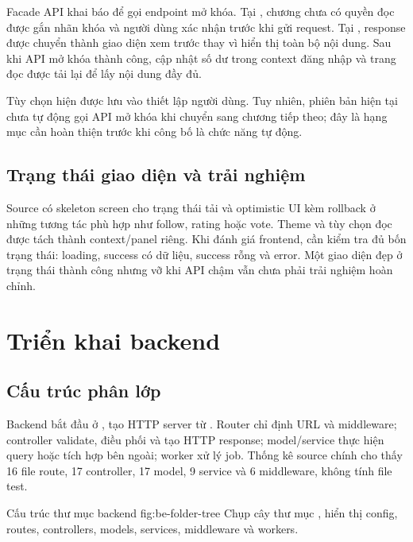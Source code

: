 Facade API khai báo  để gọi endpoint mở khóa. Tại , chương chưa có quyền đọc được gắn nhãn khóa và người dùng xác nhận trước khi gửi request. Tại , response  được chuyển thành giao diện xem trước thay vì hiển thị toàn bộ nội dung. Sau khi API mở khóa thành công,  cập nhật số dư trong context đăng nhập và trang đọc được tải lại để lấy nội dung đầy đủ.

Tùy chọn  hiện được lưu vào thiết lập người dùng. Tuy nhiên, phiên bản hiện tại chưa tự động gọi API mở khóa khi chuyển sang chương tiếp theo; đây là hạng mục cần hoàn thiện trước khi công bố là chức năng tự động.
\subsection{Trạng thái giao diện và trải nghiệm}

Source có skeleton screen cho trạng thái tải và optimistic UI kèm rollback ở những tương tác phù hợp như follow, rating hoặc vote. Theme và tùy chọn đọc được tách thành context/panel riêng. Khi đánh giá frontend, cần kiểm tra đủ bốn trạng thái: loading, success có dữ liệu, success rỗng và error. Một giao diện đẹp ở trạng thái thành công nhưng vỡ khi API chậm vẫn chưa phải trải nghiệm hoàn chỉnh.


\section{Triển khai backend}

\subsection{Cấu trúc phân lớp}

Backend bắt đầu ở , tạo HTTP server từ . Router chỉ định URL và middleware; controller validate, điều phối và tạo HTTP response; model/service thực hiện query hoặc tích hợp bên ngoài; worker xử lý job. Thống kê source chính cho thấy 16 file route, 17 controller, 17 model, 9 service và 6 middleware, không tính file test.

  {Cấu trúc thư mục backend}
  {fig:be-folder-tree}
  {Chụp cây thư mục , hiển thị config, routes, controllers, models, services, middleware và workers.}

